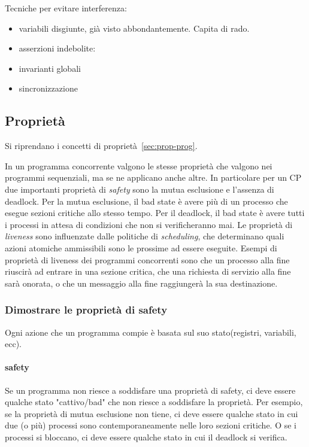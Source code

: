 \documentclass[10pt,a4paper]{article}
\begin{document}
Tecniche per evitare interferenza:
\begin{itemize}
\item variabili disgiunte, già visto abbondantemente. Capita di rado.
\item asserzioni indebolite: 
\item invarianti globali
\item sincronizzazione
\end{itemize}

\subsection{Proprietà}
Si riprendano i concetti di proprietà~\vref{sec:prop-prog}.

In un programma concorrente valgono le stesse proprietà che valgono nei programmi sequenziali, ma se ne applicano anche altre. In particolare per un CP due importanti proprietà di \textit{safety} sono la mutua 
esclusione e l'assenza di deadlock. Per la mutua esclusione, il bad state è avere più di un processo che esegue sezioni critiche allo stesso tempo.
Per il deadlock, il bad state è avere tutti i processi in attesa di condizioni che non si verificheranno mai.
Le proprietà di \textit{liveness} sono influenzate dalle politiche di \textit{scheduling}, che determinano quali azioni atomiche ammissibili sono le prossime ad essere eseguite.
Esempi di proprietà di liveness dei programmi concorrenti sono che un processo alla fine riuscirà ad entrare in una sezione critica, che una richiesta di servizio alla fine sarà onorata, o che un messaggio alla fine raggiungerà la sua destinazione.

\subsubsection{Dimostrare le proprietà di safety}
Ogni azione che un programma compie è basata sul suo stato(registri, variabili, ecc). 
\paragraph{safety}Se un programma non riesce a soddisfare una proprietà di safety, ci deve essere qualche stato "cattivo/bad" che non riesce a soddisfare la proprietà.
Per esempio, se la proprietà di mutua esclusione non tiene, ci deve essere qualche stato in cui due (o più) processi sono contemporaneamente nelle loro sezioni critiche.
O se i processi si bloccano, ci deve essere qualche stato in cui il deadlock si verifica.
\end{document}
